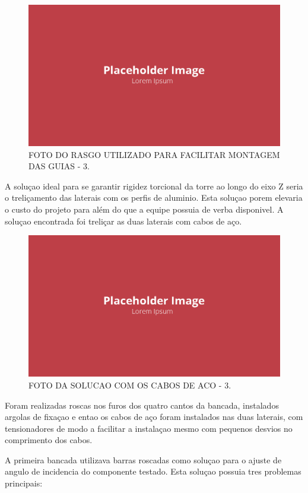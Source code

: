 \begin{figure}[!ht]
    \centering
    \includegraphics[width=.8\linewidth]{figuras/placeholder.png}
    \caption{FOTO DO RASGO UTILIZADO PARA FACILITAR MONTAGEM DAS GUIAS - 3\cite{autor}.}
    \label{fig:placeholder}
\end{figure}

A soluçao ideal para se garantir rigidez torcional da torre ao longo do eixo Z seria o treliçamento das laterais com os perfis de aluminio. Esta soluçao porem elevaria o custo do projeto para além do que a equipe possuia de verba disponivel. A soluçao encontrada foi treliçar as duas laterais com cabos de aço.

\begin{figure}[!ht]
    \centering
    \includegraphics[width=.8\linewidth]{figuras/placeholder.png}
    \caption{FOTO DA SOLUCAO COM OS CABOS DE ACO - 3\cite{autor}.}
    \label{fig:placeholder}
\end{figure}

Foram realizadas roscas nos furos dos quatro cantos da bancada, instalados argolas de fixaçao e entao os cabos de aço foram instalados nas duas laterais, com tensionadores de modo a facilitar a instalaçao mesmo com pequenos desvios no comprimento dos cabos.

A primeira bancada utilizava barras roscadas como soluçao para o ajuste de angulo de incidencia do componente testado. Esta soluçao possuia tres problemas principais:

